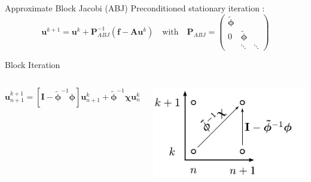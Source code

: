 \documentclass[11pt,aspectratio=43]{beamer}
\newcommand{\matr}[1]{\mathbf{#1}}
\newcommand{\vect}[1]{\boldsymbol{#1}}
\newcommand{\uvect}{\vect{u}}
\newcommand{\AMat}{\matr{A}}
\newcommand{\chiOp}{\bm{\chi}}
\newcommand{\phiApprox}{\bm{\tilde{\phi}}}
\begin{document}
\begin{frame}{Approximate Block Jacobi (ABJ)}
	Preconditioned stationary iteration :
	$$\uvect^{k+1} = \uvect^k + \matr{P}_{ABJ}^{-1}(\vect{f}-\AMat\uvect^k) \quad \text{with} \quad 
	\matr{P}_{ABJ} = \begin{pmatrix}
		\phiApprox & & \\
		0 & \phiApprox & \\
		& \ddots & \ddots
	\end{pmatrix}$$
	\begin{block}{Block Iteration}
		\begin{columns}
			\vskip-35pt
			$$\vect{u}_{n+1}^{k+1} = \left[\matr{I} - \tilde{\bm{\phi}}^{-1} \bm{\phi}\right] \vect{u}_{n+1}^{k} +
			\tilde{\bm{\phi}}^{-1}\bm{\chi}\vect{u}_{n}^{k}$$
			
			\includegraphics[width=\linewidth]{kn-approxBlockJacobi.pdf}
		\end{columns}
	\end{block}\vspace{-20pt}
\end{frame}

%			
\end{document}
